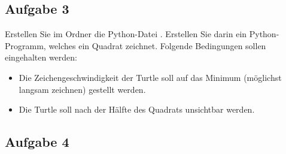 \subsection{Aufgabe 3}

Erstellen Sie im Ordner  die Python-Datei . Erstellen Sie darin ein Python-Programm, welches ein Quadrat zeichnet. Folgende Bedingungen sollen eingehalten werden:

\begin{itemize}
\item Die Zeichengeschwindigkeit der Turtle soll auf das Minimum (möglichst langsam zeichnen) gestellt werden.
\item Die Turtle soll nach der Hälfte des Quadrats unsichtbar werden.
\end{itemize} 

\subsection{Aufgabe 4}

